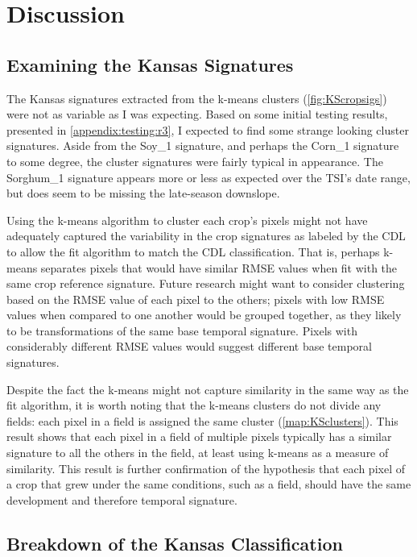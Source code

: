 \chapter{Discussion}

\section{Examining the Kansas Signatures}

The Kansas signatures extracted from the k-means clusters (\autoref{fig:KScropsigs}) were not as variable as I was expecting. Based on some initial testing results, presented in \autoref{appendix:testing:r3}, I expected to find some strange looking cluster signatures. Aside from the Soy\_1 signature, and perhaps the Corn\_1 signature to some degree, the cluster signatures were fairly typical in appearance. The Sorghum\_1 signature appears more or less as expected over the TSI's date range, but does seem to be missing the late-season downslope.

Using the k-means algorithm to cluster each crop's pixels might not have adequately captured the variability in the crop signatures as labeled by the CDL to allow the fit algorithm to match the CDL classification. That is, perhaps k-means separates pixels that would have similar RMSE values when fit with the same crop reference signature. Future research might want to consider clustering based on the RMSE value of each pixel to the others; pixels with low RMSE values when compared to one another would be grouped together, as they likely to be transformations of the same base temporal signature. Pixels with considerably different RMSE values would suggest different base temporal signatures.

Despite the fact the k-means might not capture similarity in the same way as the fit algorithm, it is worth noting that the k-means clusters do not divide any fields: each pixel in a field is assigned the same cluster (\autoref{map:KSclusters}). This result shows that each pixel in a field of multiple pixels typically has a similar signature to all the others in the field, at least using k-means as a measure of similarity. This result is further confirmation of the hypothesis that each pixel of a crop that grew under the same conditions, such as a field, should have the same development and therefore temporal signature.

\section{Breakdown of the Kansas Classification}

